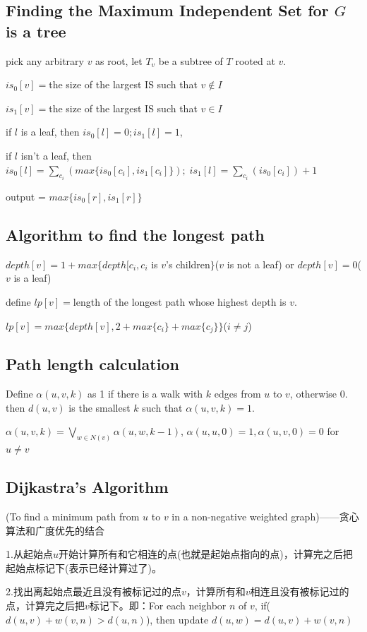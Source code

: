 \documentclass[12pt,a4paper]{ctexrep}
\begin{document}
\subsection{Finding the Maximum Independent Set for $G$ is a tree}
pick any arbitrary $v$ as root, let $T_{v}$ be a subtree of $T$ rooted at $v$.

$is_{0}[v] = $the size of the largest IS such that $v \notin I$

$is_{1}[v] = $the size of the largest IS such that $v \in I$

if $l$ is a leaf, then $is_{0}[l] = 0;is_{1}[l] = 1$,

if $l$ isn't a leaf, then $is_{0}[l] = \sum_{c_{i}}(max\{is_{0}[c_{i}], is_{1}[c_{i}]\});\; is_{1}[l] = \sum_{c_{i}}(is_{0}[c_{i}])+1$

output = $max\{is_{0}[r],is_{1}[r]\}$

\subsection{Algorithm to find the longest path} \label{sec:Algo_to_longest_path}
$depth[v] = 1+max\{depth[c_{i},c_{i}$ is $v$'s children$\}$($v$ is not a leaf) or $depth[v] = 0$($v$ is a leaf)

define $lp[v] = $length of the longest path whose highest depth is $v$.

$lp[v] = max\{depth[v],2+max\{c_{i}\}+max\{c_{j}\}\}$($i \neq j$)

\subsection{Path length calculation}
Define $\alpha(u,v,k)$ as 1 if there is a walk with $k$ edges from $u$ to $v$, otherwise 0. then $d(u,v)$ is the smallest $k$ such that $\alpha(u,v,k)=1$.

$\alpha(u,v,k) = \bigvee_{w\in N(v)} \alpha(u,w,k-1)$, $\alpha(u,u,0)=1, \alpha(u,v,0)=0$ for $u \neq v$

\subsection{Dijkastra's Algorithm}
(To find a minimum path from $u$ to $v$ in a non-negative weighted graph)——贪心算法和广度优先的结合

1.从起始点$u$开始计算所有和它相连的点(也就是起始点指向的点)，计算完之后把起始点标记下(表示已经计算过了)。

2.找出离起始点最近且没有被标记过的点$v$，计算所有和$v$相连且没有被标记过的点，计算完之后把$v$标记下。即：For each neighbor $n$ of $v$, if($d(u,v)+w(v,n)>d(u,n)$), then update $d(u,w)=d(u,v)+w(v,n)$
\end{document}
